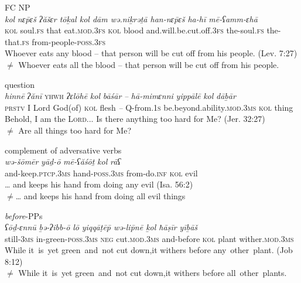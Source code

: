 \documentclass[output=paper]{langsci/langscibook}
\begin{document}
\ea%
    FC NP\label{ex:doron:39}\\
    \gll \textit{kol}   \textit{nɛ\={p}ɛš   ʔăšɛr tōḵal             kol  dām     wə.niḵrəṯā                     han-nɛ\={p}ɛš   ha-hī         mē-ʕamm-ɛhā}\\
         \textsc{kol} soul.\textsc{fs} that   eat.\textsc{mod.3fs} \textsc{kol}  blood and.will.be.cut.off.\textsc{3fs}  the-soul.\textsc{fs} the-that.\textsc{fs} from-people{}-\textsc{poss.3fs}\\
    \glt Whoever eats any blood – that person will be cut off from his people. (Lev. 7:27)\\${\neq}$  Whoever eats all the blood – that person will be cut off from his people. 
    \z

\ea%
    question\label{ex:doron:40}\\
    \gll \textit{hinnē}  \textit{ʔănī} \textsc{yhwh}  \textit{ʔɛlōhē}   \textit{kol}   \textit{bāśār} \textit{–}  \textit{hā-mimɛnni}  \textit{yippālē}                                  \textit{kol}   \textit{dāḇār}\\
         \textsc{prstv} I      Lord    God(of) \textsc{kol} flesh  \textit{–}  Q-from.1\textsc{s}    be.beyond.ability.\textsc{mod.3ms}  \textsc{kol} thing \\
    \glt Behold, I am the \textsc{\textsc{L}ord}... Is there anything too hard for Me? (Jer. 32:27)\\${\neq}$   Are all things too hard for Me? 
    \z     

\ea%
    complement of adversative verbs\label{ex:doron:41}\\
    \gll \textit{wə-šōmēr}                  \textit{yāḏ-ō}                 \textit{mē-ʕăśōṯ}      \textit{kol}   \textit{rāʕ}\\
         and-keep.\textsc{ptcp.3ms}  hand{}-\textsc{poss.3ms} from-do.\textsc{inf}  \textsc{kol} evil \\
    \glt … and keeps his hand from doing any evil  (Isa. 56:2)\\${\neq}$… and keeps his hand from doing all evil things
    \z

\ea%
    \textit{before}{}-PPs\label{ex:doron:42}\\
    \gll \textit{ʕōḏ-ɛnnū}  \textit{ḇə-ʔibb-ō}                \textit{lō}     \textit{yiqqāṭē}\textit{\={p}         \textit{wə-li}}\textit{\={p}\textit{nē}       \textit{ḵol}   \textit{ħāṣīr}  \textit{yīḇāš}}\\
         still-\textsc{3ms} in-green-\textsc{poss.3ms}  \textsc{neg}   cut.\textsc{mod.3ms}  and-before  \textsc{kol} plant  wither.\textsc{mod.3ms}\\
    \glt While it~is~yet green~and~not cut down,it withers before any~other~plant. (Job 8:12)\\${\neq}$  While it~is~yet green~and~not cut down,it withers before all~other~plants.
    \z
\end{document}

